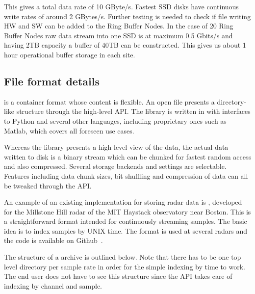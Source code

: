 \documentclass[12pt,a4paper]{article}
\begin{document}
This gives a total data rate of 10 GByte/s. Fastest SSD disks have continuous write rates of around 2 GBytes/s. Further testing is needed to check if file writing HW and SW can be added to the Ring Buffer Nodes. In the case of 20 Ring Buffer Nodes raw data stream into one SSD is at maximum 0.5 Gbits/s and having 2TB capacity a buffer of 40TB can be constructed. This gives us about 1 hour operational buffer storage in each site.  

\subsection{File format details}

\HDF is a container format whose content is flexible. An open \HDF file presents a directory-like structure through the high-level API. The library is written in \CP with interfaces to Python and several other languages, including proprietary ones such as Matlab, which covers all foreseen \ED use cases. 

Whereas the \HDF library presents a high level view of the data, the actual data written to disk is a binary stream which can be chunked for fastest random access and also compressed. Several storage backends and settings are selectable. Features including data chunk sizes, bit shuffling and compression of data can all be tweaked through the API.

An example of an existing \HDF implementation for storing radar data is \DRF, developed for the Millstone Hill radar of the MIT Haystack observatory near Boston. This is a straightforward \HDF format intended for continuously streaming samples.  The basic idea is to index samples by UNIX time. The format is used at several radars and the code is available on Github~\cite{drf}.

The structure of a \DRF archive is outlined below.  Note that there has to be one top level directory per sample rate in order for the simple indexing by time to work. The end user does not have to see this structure since the API takes care of indexing by channel and sample.
\end{document}
